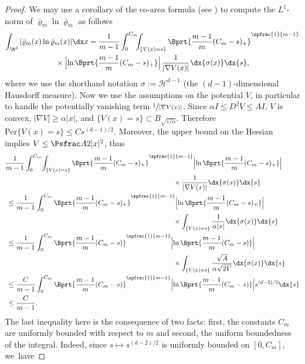 \begin{proof}
We may use a corollary of the co-area formula (see \cite[\S 3.4.4, Prop.\,3]{EvaGar}) to compute the $L^1$-norm of $\bar\varrho_m \ln \bar\varrho_m$ as follows
\begin{multline*}
\int_{\R^d} |\bar\varrho_m(x) \ln \bar\varrho_m(x)| \dx x
= \frac{1}{m-1}\int_0^{C_m}\!\!\! \int_{\{V(x)={s}\}}\Bprt{\frac{m-1}{m}(C_m -{s})_+}^{\spfrac{1}{m-1}}\\
{}\times\Bigl|\ln \Bprt{\frac{m-1}{m}(C_m -{s})_+} \Bigr|\,\frac{1}{|\nabla V(x)|} \dx{\sigma(x)} \dx {s},
\end{multline*}
where we use the shorthand notation $\sigma:=\mathcal{H}^{d-1}$ (the $(d-1)$-dimensional Hausdorff measure).
Now we use the assumptions on the potential $V$, in particular to handle the potentially vanishing term $\sfrac{1}{|\nabla V(x)|}$. Since $\alpha I \leq D^2 V\leq A I$, $V$ is convex, $|\nabla V|\geq \alpha |x|$, and $\{V(x)={s}\}\subset B_{\sqrt{{s}/\alpha}}$. Therefore $\mathrm{Per}\{V(x)={s}\} \leq C {s}^{(d-1)/2}$. Moreover, the upper bound on the Hessian implies $V\leq \Psfrac A 2 |x|^2$, thus
\begin{align*}
& \frac{1}{m-1}\int_0^{C_m}\! \int_{\{V(x)={s}\}} \Bprt{\frac{m-1}{m}(C_m -{s})_+}^{\spfrac{1}{m-1}} \Bigl|\ln \Bprt{\frac{m-1}{m}(C_m -{s})_+} \Bigr|\\
&\hspace*{8.5cm}{}\times\frac{1}{|\nabla V(x)|} \dx{\sigma(x)} \dx {s} \\
&\:\leq \frac{1}{m-1}\int_0^{C_m} \Bprt{\frac{m-1}{m}(C_m -{s})_+}^{\spfrac{1}{m-1}} \Bigl|\ln \Bprt{\frac{m-1}{m}(C_m -{s})_+} \Bigr|\\
&\hspace*{8.5cm}{}\times \int_{\{V(x)={s}\}} \frac{1}{\alpha |x|} \dx{\sigma(x)}\dx {s}\\
&\:\leq \frac{1}{m-1}\int_0^{C_m} \Bprt{\frac{m-1}{m}(C_m -{s})}^{\spfrac{1}{m-1}} \Bigl|\ln \Bprt{\frac{m-1}{m}(C_m -{s})} \Bigr|\\
&\hspace*{8.5cm}{}\times\int_{\{V(x)={s}\}} \frac{\sqrt{A }}{\alpha\sqrt{2{V}}}\dx{\sigma(x)}\dx {s}\\
&\:\leq \frac{C}{m-1}\int_0^{C_m} \Bprt{\frac{m-1}{m}(C_m -{s})}^{\spfrac{1}{m-1}} \Bigl|\ln \Bprt{\frac{m-1}{m}(C_m -{s})} \Bigr| {s}^{(d-2)/2} {\dx {s}}\\
&\:\leq \frac{C}{m-1}.
\end{align*}
The last inequality here is the consequence of two facts: first, the constants $C_{m}$ are uniformly bounded with respect to $m$ and second, the uniform boundedness of the integral. Indeed, since $s\mapsto s^{(d-2)/2}$ is uniformly bounded on $[0,C_{m}]$, we~have

\end{proof}
